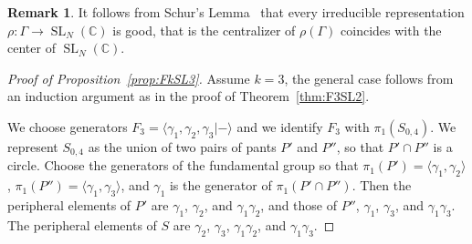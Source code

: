 \documentclass[11pt]{article}
\theoremstyle{definition}
\newtheorem{rema}[theo]{Remark}
\numberwithin{equation}{section}
\numberwithin{figure}{section}
\numberwithin{table}{section}
\DeclareMathOperator{\SL}{SL}
\newcommand{\Cbb}{\mathbb{C}}
\begin{document}
\begin{rema}\label{Remark:good}
It follows from Schur's Lemma~\cite{FultonHarris} that every irreducible representation $\rho\colon\Gamma\to \SL_N(\Cbb)$ is good, that is the centralizer of $\rho(\Gamma)$ coincides with the center of $\SL_N(\Cbb)$.
\end{rema}



\begin{proof}[Proof of Proposition~\ref{prop:FkSL3}]
Assume $k=3$, the general case follows from an induction argument as in the proof of Theorem~\ref{thm:F3SL2}.

We choose generators $F_3 =\langle \gamma_1,\gamma_2,\gamma_3 |-\rangle$ and we identify $F_3$ with $\pi_1(S_{0,4})$. We represent $S_{0,4}$ as the union of two pairs of pants $P'$ and $P''$, so that $P'\cap P''$ is a circle. Choose the generators of the fundamental group so that $\pi_1 (P')=\langle \gamma_1,\gamma_2 \rangle$, $\pi_1 (P'')=\langle \gamma_1,\gamma_3 \rangle$, and $\gamma_1$ is the generator of $\pi_1(P'\cap P'') $. Then the peripheral elements of $P'$ are $\gamma_1$, $\gamma_2$, and $\gamma_1\gamma_2$, and those of $P''$, $\gamma_1$, $\gamma_3$, and $\gamma_1\gamma_3$. The peripheral elements of $S$ are $\gamma_2$, $\gamma_3$, $\gamma_1\gamma_2$, and $\gamma_1\gamma_3$.



\end{proof}
\end{document}
